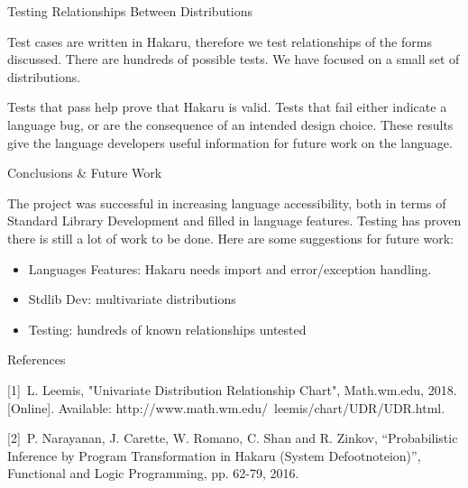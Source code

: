 \documentclass[22pt]{beamer}
\begin{document}
\begin{frame}[fragile]
\begin{textblock}{5}
\begin{block}{\Large{Testing Relationships Between Distributions}}
{\bigskip
Test cases are written in Hakaru, therefore we test relationships of the forms discussed. There are hundreds of possible tests. We have focused on a small set of distributions.

\bigskip
Tests that pass help prove that Hakaru is valid. Tests that fail either indicate a language bug, or are the consequence of an intended design choice. These results give the language developers useful information for future work on the language.
}

\end{block}


\begin{block}{\Large{Conclusions \& Future Work}}

\small{The project was successful in increasing language accessibility, both in terms of Standard Library Development and filled in language features. Testing has proven there is still a lot of work to be done. Here are some suggestions for future work:

\begin{itemize}
    \item Languages Features: Hakaru needs import and error/exception handling. 
    \item Stdlib Dev: multivariate distributions
    \item Testing: hundreds of known relationships untested 
\end{itemize}

}

\end{block}


\begin{block}{\Large{References}}

\small{[1]~L. Leemis, "Univariate Distribution Relationship Chart", Math.wm.edu, 2018. [Online]. Available: http://www.math.wm.edu/~leemis/chart/UDR/UDR.html. 

[2]~P. Narayanan, J. Carette, W. Romano, C. Shan and R. Zinkov, “Probabilistic Inference by Program Transformation in Hakaru (System Defootnoteion)”, Functional and Logic Programming, pp. 62-79, 2016.}


\end{block}


% 

\end{textblock}
\end{frame}
\end{document}
